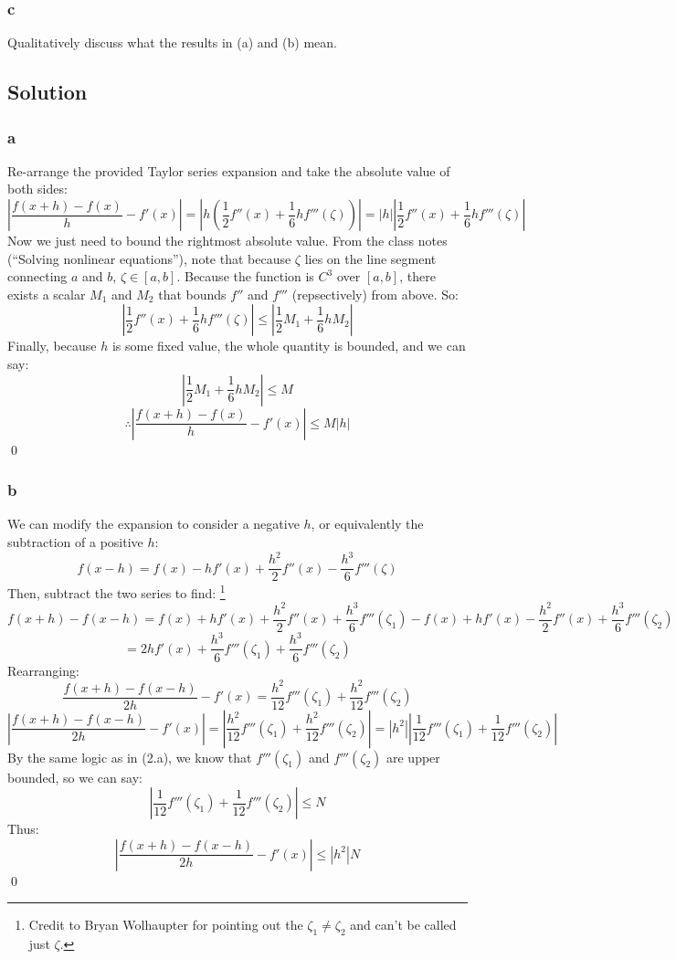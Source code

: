 \documentclass[11pt]{report}
\theoremstyle{definition}
\begin{document}
\subsubsection*{c}
Qualitatively discuss what the results in (a) and (b) mean.

\subsection*{Solution}
\subsubsection*{a}
Re-arrange the provided Taylor series expansion and take the absolute value of both sides:
\[
	\left|\frac{f(x+h)-f(x)}{h} - f'(x)\right|
	= \left|h(\frac{1}{2}f''(x)+\frac{1}{6}hf'''(\zeta))\right|
	= \left|h\right|\left|\frac{1}{2}f''(x)+\frac{1}{6}hf'''(\zeta)\right|
\]
Now we just need to bound the rightmost absolute value. From the class notes
(``Solving nonlinear equations''), note that because $\zeta$ lies on the line
segment connecting $a$ and $b$, $\zeta\in[a,b]$. Because the function is $C^3$
over $[a,b]$, there exists a scalar $M_1$ and $M_2$ that bounds $f''$ and $f'''$
(repsectively) from above. So:
\[
	\left|\frac{1}{2}f''(x)+\frac{1}{6}hf'''(\zeta)\right|
	\leq\left|\frac{1}{2}M_1 + \frac{1}{6}hM_2\right|
\]
Finally, because $h$ is some fixed value, the whole quantity is bounded, and we can say:
\[
	\left|\frac{1}{2}M_1 + \frac{1}{6}hM_2\right|
	\leq M
\]
\[
	\therefore
	\left|\frac{f(x+h)-f(x)}{h} - f'(x)\right|
	\leq M|h|
\]
\qed

\subsubsection*{b}
We can modify the expansion to consider a negative $h$, or equivalently the subtraction of
a positive $h$:
\[
	f(x-h) = f(x) - hf'(x) + \frac{h^2}{2}f''(x)-\frac{h^3}{6}f'''(\zeta)
\]
Then, subtract the two series to find:
\footnote{Credit to Bryan Wolhaupter for pointing out the $\zeta_1\neq\zeta_2$
	and can't be called just $\zeta$.}
\[
	f(x+h)-f(x-h)
	= f(x)+hf'(x)+\frac{h^2}{2}f''(x)+\frac{h^3}{6}f'''(\zeta_1)
	- f(x)+hf'(x)-\frac{h^2}{2}f''(x)+\frac{h^3}{6}f'''(\zeta_2)
\]
\[
	= 2hf'(x)+\frac{h^3}{6}f'''(\zeta_1)+\frac{h^3}{6}f'''(\zeta_2)
\]
Rearranging:
\[
	\frac{f(x+h)-f(x-h)}{2h} -f'(x)
	= \frac{h^2}{12}f'''(\zeta_1) + \frac{h^2}{12}f'''(\zeta_2)
\]
\[
	\left|\frac{f(x+h)-f(x-h)}{2h} -f'(x)\right|
	= \left| \frac{h^2}{12}f'''(\zeta_1) + \frac{h^2}{12}f'''(\zeta_2) \right|
	= \left|h^2\right|\left|\frac{1}{12}f'''(\zeta_1)+\frac{1}{12}f'''(\zeta_2)\right|
\]
By the same logic as in (2.a), we know that $f'''(\zeta_{1})$ and $f'''(\zeta_{2})$ are upper bounded, so we can say:
\[
	\left|\frac{1}{12}f'''(\zeta_1)+\frac{1}{12}f'''(\zeta_2)\right|\leq N
\]
Thus:
\[
	\left|\frac{f(x+h)-f(x-h)}{2h} -f'(x)\right|
	\leq \left|h^2\right|N
\]
\qed
\end{document}
